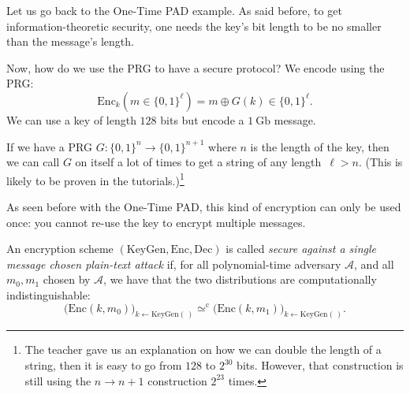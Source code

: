 \documentclass[./main]{subfiles}
\begin{document}
  \begin{exm}
    Let us go back to the One-Time PAD example.
    As said before, to get information-theoretic security, one needs the key's bit length to be no smaller than the message's length.
    
    Now, how do we use the PRG to have a secure protocol?
    We encode using the PRG:
    \[
    \mathrm{Enc}_k(m \in \{0,1\}^\ell) = m \oplus G(k) \in \{0,1\}^\ell
    .\]
    We can use a key of length $128$ bits but encode a $1\:\mathrm{Gb}$ message.

    If we have a PRG $G : \{0,1\}^n \to \{0,1\}^{n+1}$ where $n$ is the length of the key, then we can call $G$ on itself a lot of times to get a string of any length~$\ell > n$. (This is likely to be proven in the tutorials.)\footnote{The teacher gave us an explanation on how we can double the length of a string, then it is easy to go from $128$ to $2^{30}$ bits. However, that construction is still using the $n \to n + 1$ construction  $2^{23}$ times.}
  \end{exm}

  As seen before with the One-Time PAD, this kind of encryption can only be used once: you cannot re-use the key to encrypt multiple messages.


  \begin{defn}
    An encryption scheme $(\mathrm{KeyGen}, \mathrm{Enc}, \mathrm{Dec})$ is called \textit{secure against a single message chosen plain-text attack} if, for all polynomial-time adversary $\mathcal{A}$, and all $m_0, m_1$ chosen by $\mathcal{A}$, we have that the two distributions are computationally indistinguishable:
    \[
      \big( \mathrm{Enc}(k, m_0) \big)_{k \gets \mathrm{KeyGen}(\,)} \simeq^\mathrm{c} \big( \mathrm{Enc}(k, m_1) \big)_{k \gets \mathrm{KeyGen}(\,)}
    .\]
  \end{defn}
\end{document}
